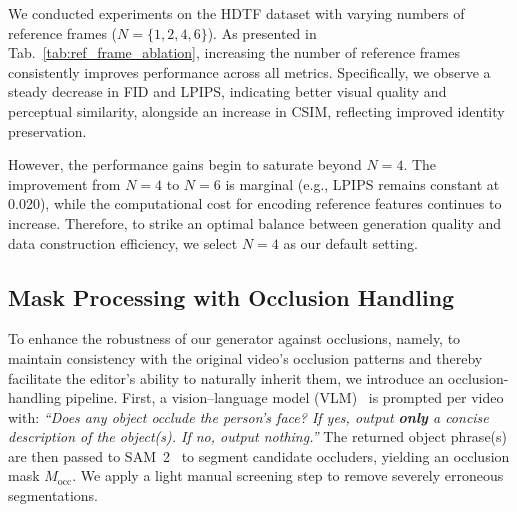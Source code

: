 We conducted experiments on the HDTF dataset with varying numbers of reference frames ($N=\{1, 2, 4, 6\}$). As presented in Tab.~\ref{tab:ref_frame_ablation}, increasing the number of reference frames consistently improves performance across all metrics. Specifically, we observe a steady decrease in FID and LPIPS, indicating better visual quality and perceptual similarity, alongside an increase in CSIM, reflecting improved identity preservation. 

However, the performance gains begin to saturate beyond $N=4$. The improvement from $N=4$ to $N=6$ is marginal (e.g., LPIPS remains constant at 0.020), while the computational cost for encoding reference features continues to increase. Therefore, to strike an optimal balance between generation quality and data construction efficiency, we select $N=4$ as our default setting.

\begin{table}[h]
\centering
\caption{Impact of the number of reference frames on the mask-based generator (evaluated on HDTF). \textbf{Bold} indicates the best performance.}
\label{tab:ref_frame_ablation}
\end{table}


\subsection{Mask Processing with Occlusion Handling}  
To enhance the robustness of our generator against occlusions, namely, to maintain consistency with the original video’s occlusion patterns and thereby facilitate the editor’s ability to naturally inherit them, we introduce an occlusion-handling pipeline.
First, a vision–language model (VLM)~\citep{bai2025qwen2} is prompted per video with:
\emph{“Does any object occlude the person’s face? If yes, output \textbf{only} a concise description of the object(s). If no, output nothing.”}
The returned object phrase(s) are then passed to SAM~2~\citep{ravi2024sam2} to segment candidate occluders, yielding an occlusion mask $M_{\text{occ}}$.
We apply a light manual screening step to remove severely erroneous segmentations.

